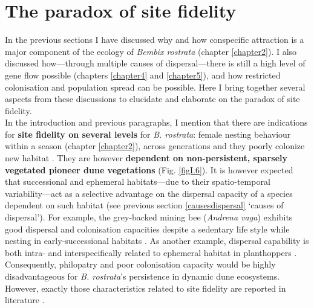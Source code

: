 \documentclass[10pt, twoside]{book} %
\begin{document}
	\section{The paradox of site fidelity}\label{discparadox}
	In the previous sections I have discussed why and how conspecific attraction is a major component of the ecology of \textit{Bembix rostrata} (chapter \ref{chapter2}). I also discussed how---through multiple causes of dispersal---there is still a high level of gene flow possible (chapters \ref{chapter4} and \ref{chapter5}), and how restricted colonisation and population spread can be possible. Here I bring together several aspects from these discussions to elucidate and elaborate on the paradox of site fidelity.\\
	
	In the introduction and previous paragraphs, I mention that there are indications for \textbf{site fidelity on several levels} for \textit{B. rostrata}: female nesting behaviour within a season (chapter \ref{chapter2}), across generations and they poorly colonize new habitat \citep{nielsen1945, blosch2000, bogusch2021}. They are however \textbf{dependent on non-persistent, sparsely vegetated pioneer dune vegetations} (Fig. \ref{figI.6}). It is however expected that successional and ephemeral habitats---due to their spatio-temporal variability---act as a selective advantage on the dispersal capacity of a species dependent on such habitat \citep{mcpeek1992, olivieri1995, bowler2005, matthysen2012} (see previous section \ref{causesdispersal} `causes of dispersal'). For example, the grey-backed mining bee (\textit{Andrena vaga}) exhibits good dispersal and colonisation capacities despite a sedentary life style while nesting in early-successional habitats \citep{exeler2008, cerna2013}. As another example, dispersal capability is both intra- and interspecifically related to ephemeral habitat in planthoppers \citep{denno1991, denno1996}. Consequently, philopatry and poor colonisation capacity would be highly disadvantageous for \textit{B. rostrata}'s persistence in dynamic dune ecosystems. However, exactly those characteristics related to site fidelity are reported in literature \citep{nielsen1945, blosch2000, bogusch2021}.\\
	
\end{document}
